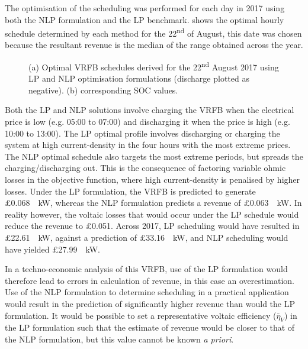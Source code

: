 \documentclass[preprint,3p,review,authoryear,10pt]{elsarticle}
\begin{document}
The optimisation of the scheduling was performed for each day in 2017 using both the NLP formulation and the LP benchmark.  shows the optimal hourly schedule determined by each method for the 22\textsuperscript{nd} of August, this date was chosen because the resultant revenue is the median of the range obtained across the year.

\begin{figure}[!ht]
\centering
{}
\caption{(a) Optimal VRFB schedules derived for the 22\textsuperscript{nd} August 2017 using LP and NLP optimisation formulations (discharge plotted as negative). (b) corresponding SOC values.}
\end{figure}

Both the LP and NLP solutions involve charging the VRFB when the electrical price is low (e.g. 05:00 to 07:00) and discharging it when the price is high (e.g. 10:00 to 13:00). The LP optimal profile involves discharging or charging the system at high current-density in the four hours with the most extreme prices. The NLP optimal schedule also targets the most extreme periods, but spreads the charging/discharging out. This is the consequence of factoring variable ohmic losses in the objective function, where high current-density is penalised by higher losses. Under the LP formulation, the VRFB is predicted to generate \pounds \SI{0.068}{\per\kilo\watt}, whereas the NLP formulation predicts a revenue of \pounds \SI{0.063}{\per\kilo\watt}. In reality however, the voltaic losses that would occur under the LP schedule would reduce the revenue to \pounds 0.051. Across 2017, LP scheduling would have resulted in \pounds \SI{22.61}{\per\kilo\watt}, against a prediction of \pounds \SI{33.16}{\per\kilo\watt}, and NLP scheduling would have yielded \pounds \SI{27.99}{\per\kilo\watt}.

In a techno-economic analysis of this VRFB, use of the LP formulation would therefore lead to errors in calculation of revenue, in this case an overestimation. Use of the NLP formulation to determine scheduling in a practical application would result in the prediction of significantly higher revenue than would the LP formulation. It would be possible to set a representative voltaic efficiency ($\bar\eta_V$) in the LP formulation such that the estimate of revenue would be closer to that of the NLP formulation, but this value cannot be known \textit{a priori}.
\end{document}
